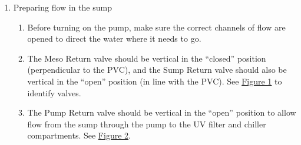 \documentclass[
]{book}
\providecommand{\tightlist}{%
  \setlength{\itemsep}{0pt}\setlength{\parskip}{0pt}}
\begin{document}
\begin{enumerate}
\def\labelenumi{\arabic{enumi}.}
\tightlist
\item
  Preparing flow in the sump

  \begin{enumerate}
  \def\labelenumii{\arabic{enumii}.}
  \tightlist
  \item
    Before turning on the pump, make sure the correct channels of flow are opened to direct the water where it needs to go.
  \item
    The Meso Return valve should be vertical in the ``closed'' position (perpendicular to the PVC), and the Sump Return valve should also be vertical in the ``open'' position (in line with the PVC). See \protect\hyperlink{Figure1}{Figure 1} to identify valves.
  \item
    The Pump Return valve should be vertical in the ``open'' position to allow flow from the sump through the pump to the UV filter and chiller compartments. See \protect\hyperlink{Figure2}{Figure 2}.


\end{enumerate}
\end{enumerate}
\end{document}

